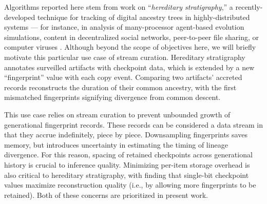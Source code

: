Algorithms reported here stem from work on ``\textit{hereditary stratigraphy},'' a recently-developed technique for tracking of digital ancestry trees in highly-distributed systems --- for instance, in analysis of many-processor agent-based evolution simulations, content in decentralized social networks, peer-to-peer file sharing, or computer viruses \citep{moreno2022hereditary}.
Although beyond the scope of objectives here, we will briefly motivate this particular use case of stream curation.
Hereditary stratigraphy annotates surveilled artifacts with checkpoint data, which is extended by a new ``fingerprint'' value with each copy event.
Comparing two artifacts' accreted records reconstructs the duration of their common ancestry, with the first mismatched fingerprints signifying divergence from common descent.

This use case relies on stream curation to prevent unbounded growth of generational fingerprint records.
These records can be considered a data stream in that they accrue indefinitely, piece by piece.
Downsampling fingerprints saves memory, but introduces uncertainty in estimating the timing of lineage divergence.
For this reason, spacing of retained checkpoints across generational history is crucial to inference quality.
Minimizing per-item storage overhead is also critical to hereditary stratigraphy, with \citet{moreno2024guide} finding that single-bit checkpoint values maximize reconstruction quality (i.e., by allowing more fingerprints to be retained).
Both of these concerns are prioritized in present work.

